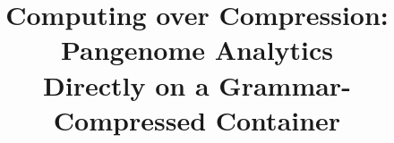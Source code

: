 \documentclass[letterpaper,twocolumn,10pt]{article}
\begin{document}
\date{}

\title{\Large \bf Computing over Compression: Pangenome Analytics\\
Directly on a Grammar-Compressed Container}

\author{}

\maketitle

\begin{abstract}

\end{abstract}












\balance


\end{document}
